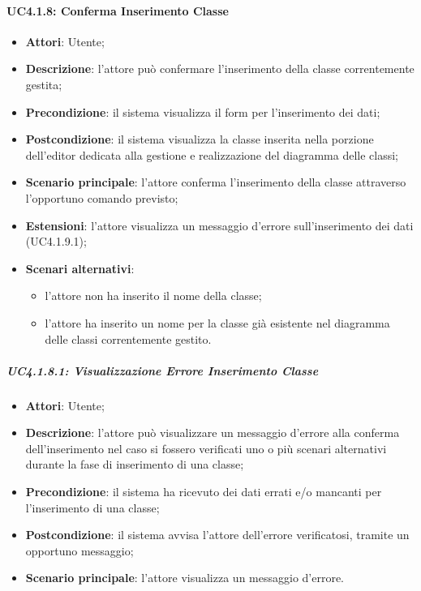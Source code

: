 \paragraph{UC4.1.8: Conferma Inserimento Classe}
\label{UC4.1.8}
\begin{itemize}
	\item \textbf{Attori}: Utente;
	\item \textbf{Descrizione}: l'attore può confermare l'inserimento della classe correntemente gestita;
	\item \textbf{Precondizione}: il sistema visualizza il form per l'inserimento dei dati;
	\item \textbf{Postcondizione}: il sistema visualizza la classe inserita nella porzione dell'editor dedicata alla gestione e realizzazione del diagramma delle classi;
	\item \textbf{Scenario principale}: l'attore conferma l'inserimento della classe attraverso l'opportuno comando previsto;
	\item \textbf{Estensioni}: l'attore visualizza un messaggio d'errore sull'inserimento dei dati (UC4.1.9.1);
	\item \textbf{Scenari alternativi}:
	\begin{itemize}
		\item l'attore non ha inserito il nome della classe;
		\item l'attore ha inserito un nome per la classe già esistente nel diagramma delle classi correntemente gestito.
	\end{itemize}
\end{itemize}

\subparagraph{UC4.1.8.1: Visualizzazione Errore Inserimento Classe}
\label{UC4.1.8.1}
\begin{itemize}
	\item \textbf{Attori}: Utente;
	\item \textbf{Descrizione}: l'attore può visualizzare un messaggio d'errore alla conferma dell'inserimento nel caso si fossero verificati uno o più scenari alternativi durante la fase di inserimento di una classe;
	\item \textbf{Precondizione}: il sistema ha ricevuto dei dati errati e/o mancanti per l'inserimento di una classe;
	\item \textbf{Postcondizione}: il sistema avvisa l'attore dell'errore verificatosi, tramite un opportuno messaggio;
	\item \textbf{Scenario principale}: l'attore visualizza un messaggio d'errore.
\end{itemize}

